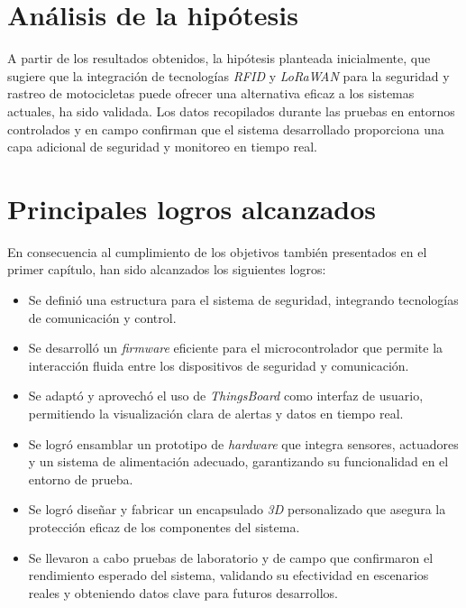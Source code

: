 \section{Análisis de la hipótesis}

A partir de los resultados obtenidos, la hipótesis planteada inicialmente, que sugiere que la integración de tecnologías \textit{RFID} y \textit{LoRaWAN} para la seguridad y rastreo de motocicletas puede ofrecer una alternativa eficaz a los sistemas actuales, ha sido validada. Los datos recopilados durante las pruebas en entornos controlados y en campo confirman que el sistema desarrollado proporciona una capa adicional de seguridad y monitoreo en tiempo real.

\section{Principales logros alcanzados}
En consecuencia al cumplimiento de los objetivos también presentados en el primer capítulo, han sido alcanzados los siguientes logros:

\begin{itemize}
    \item Se definió una estructura para el sistema de seguridad, integrando tecnologías de comunicación y control.
    \item Se desarrolló un \textit{firmware} eficiente para el microcontrolador que permite la interacción fluida entre los dispositivos de seguridad y comunicación.
    \item Se adaptó y aprovechó el uso de \textit{ThingsBoard} como interfaz de usuario, permitiendo la visualización clara de alertas y datos en tiempo real.
    \item Se logró ensamblar un prototipo de \textit{hardware} que integra sensores, actuadores y un sistema de alimentación adecuado, garantizando su funcionalidad en el entorno de prueba.
    \item Se logró diseñar y fabricar un encapsulado \textit{3D} personalizado que asegura la protección eficaz de los componentes del sistema.
    \item Se llevaron a cabo pruebas de laboratorio y de campo que confirmaron el rendimiento esperado del sistema, validando su efectividad en escenarios reales y obteniendo datos clave para futuros desarrollos.
\end{itemize}

